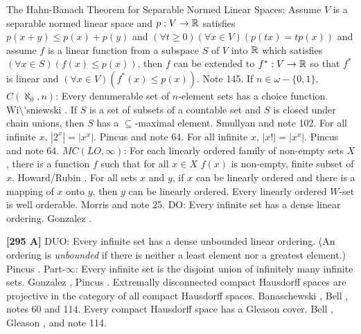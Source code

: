 \medskip
{} The Hahn-Banach Theorem for Separable
Normed Linear Spaces:  Assume $V$ is a separable normed linear space
and $p :V \to \Bbb R$ satisfies $p(x+y) \le p(x) + p(y)$ and
$(\forall t \ge 0)(\forall x \in V)(p(tx) = tp(x))$
and assume $f$ is a linear function from a subspace $S$ of
$V$ into $\Bbb R$ which satisfies $(\forall x \in S)(f(x) \le
p(x))$, then $f$ can be extended to $f^* :V \to \Bbb R$ so that $f^* $
is linear and $(\forall x \in V)(f^*(x) \le p(x))$.  Note 145.
\medskip
{} If $n\in\omega-\{0,1\}$, $C(\aleph_0,n)$:
Every denumerable set of $n$-element sets has a choice function.
\ac{Wi\'sniewski} \cite{1972}.
\medskip
{} If $S$ is a set of subsets of a countable set
and $S$ is closed under chain unions, then $S$ has a $\subseteq$-maximal
element.  \ac{Smullyan} \cite{1994} and note 102.
\medskip
{}  For all infinite $x$, $|2^x|=|x^x|$. \ac{Pincus}
\cite{1978} and note 64.
\medskip
{}  For all infinite $x$, $|x!|=|x^x|$. \ac{Pincus}
\cite{1978} and note 64.
\medskip
{} $MC(LO,\infty)$: For each linearly ordered family
of non-empty sets $X$, there is a function $f$ such that for all $x\in X$
$f(x)$ is non-empty, finite subset of $x$. \ac{Howard/Rubin} \cite{1977}.
\medskip
{}  For all sets $x$ and $y$, if $x$ can be
linearly ordered and there is a mapping of $x$ onto $y$, then
$y$ can be linearly ordered.
\medskip
{}  Every linearly ordered $W$-set is well
orderable.  \ac{Morris} \cite{1969} and note 25.
\medskip
{}  DO:  Every infinite set has a dense linear
ordering.  \ac{Gonzalez} \cite{1995a}.
\smallskip
\item{}{\bf [295 A]} DUO: Every infinite set has a dense unbounded linear
ordering. (An ordering is {\it unbounded} if there is neither a least
element nor a greatest element.)  \ac{Pincus} \cite{1997}.
\medskip
{} Part-$\infty$: Every infinite set is the disjoint
union of infinitely many infinite sets.  \ac{Gonzalez} \cite{1995b},
\ac{Pincus} \cite{1997}.
\medskip
{} Extremally disconnected compact Hausdorff spaces
are projective in the category of all compact Hausdorff spaces.
\ac{Banaschewski} \cite{1988}, \ac{Bell} \cite{1988}, notes 60 and 114.
\medskip
{} Every compact Hausdorff space has a Gleason cover.
\ac{Bell} \cite{1988}, \ac{Gleason} \cite{1958}, and note 114.
